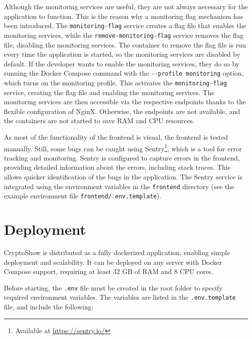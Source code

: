 Although the monitoring services are useful, they are not always necessary for the application to function. This is the reason why a monitoring flag mechanism has been introduced. The \lstinline|monitoring-flag| service creates a flag file that enables the monitoring services, while the \lstinline|remove-monitoring-flag| service removes the flag file, disabling the monitoring services. The container to remove the flag file is run every time the application is started, so the monitoring services are disabled by default. If the developer wants to enable the monitoring services, they do so by running the Docker Compose command with the \lstinline|--profile monitoring| option, which turns on the monitoring profile. This activates the \lstinline|monitoring-flag| service, creating the flag file and enabling the monitoring services. The monitoring services are then accessible via the respective endpoints thanks to the flexible configuration of NginX. Otherwise, the endpoints are not available, and the containers are not started to save RAM and CPU resources.

As most of the functionality of the frontend is visual, the frontend is tested manually. Still, some bugs can be caught using Sentry\footnote{Available at \url{https://sentry.io/}}, which is a tool for error tracking and monitoring. Sentry is configured to capture errors in the frontend, providing detailed information about the errors, including stack traces. This allows quicker identification of the bugs in the application. The Sentry service is integrated using the environment variables in the \lstinline|frontend| directory (see the example environment file \lstinline|frontend/.env.template|).

\section{Deployment}
\label{sec:deployment}

CryptoShow is distributed as a fully dockerized application, enabling simple deployment and scalability. It can be deployed on any server with Docker Compose support, requiring at least 32 GB of RAM and 8 CPU cores.

Before starting, the \lstinline|.env| file must be created in the root folder to specify required environment variables. The variables are listed in the \lstinline|.env.template| file, and include the following:


